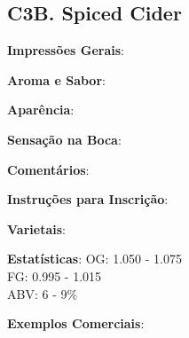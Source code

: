 \subsection*{C3B. Spiced Cider}

\textbf{Impressões Gerais}:

\textbf{Aroma e Sabor}:

\textbf{Aparência}:

\textbf{Sensação na Boca}:

\textbf{Comentários}:

\textbf{Instruções para Inscrição}:

\textbf{Varietais}:

\textbf{Estatísticas}: OG: 1.050 - 1.075 \\
\phantom{ } \hspace{16.5mm} FG: 0.995 - 1.015 \\
\phantom{ } \hspace{16.5mm} ABV: 6 - 9\%

\textbf{Exemplos Comerciais}: